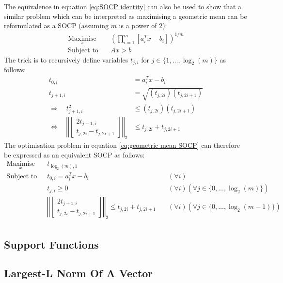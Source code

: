 The equivalence in equation \ref{eq:SOCP identity} can also be used to show that a similar problem which can be interpreted as maximising a geometric mean can be reformulated as a SOCP (assuming $m$ is a power of 2):
\begin{equation}
\begin{aligned}
    \underset{x}{\text{Maximise}} \quad & \left( \prod_{i=1}^{m}\left[ a_i^T x - b_i \right] \right)^{1/m} \\
    \text{Subject to} \quad & Ax > b
\end{aligned} \label{eq:geometric mean SOCP}
\end{equation}
The trick is to recursively define variables $t_{j, i}$ for $j\in\{1,\hdots,\log_2(m)\}$ as follows:
\begin{align*}
    t_{0, i} &= a_i^T x - b_i \\
    t_{j+1, i} &= \sqrt{(t_{j, 2i})(t_{j, 2i+1})} \\
    \Rightarrow \quad t_{j+1, i}^2 &\le (t_{j, 2i})(t_{j, 2i+1}) \\
    \Leftrightarrow \quad \left\Vert\begin{bmatrix}
        2t_{j+1, i} \\
        t_{j, 2i} - t_{j, 2i+1}
    \end{bmatrix}\right\Vert_2 &\le t_{j, 2i} + t_{j, 2i+1}
\end{align*}
The optimisation problem in equation \ref{eq:geometric mean SOCP} can therefore be expressed as an equivalent SOCP as follows:
\begin{equation}
\begin{aligned}
    \underset{x}{\text{Maximise}} \quad & t_{\log_2(m), 1} \\
    \text{Subject to} \quad & t_{0, i} = a_i^T x - b_i \quad & (\forall i) \\
    & t_{j, i} \ge 0 \quad & (\forall i)(\forall j \in \{0, \hdots, \log_2(m)\}) \\
    & \left\Vert\begin{bmatrix}
        2t_{j+1, i} \\
        t_{j, 2i} - t_{j, 2i+1}
    \end{bmatrix}\right\Vert_2 \le t_{j, 2i} + t_{j, 2i+1} \quad & (\forall i)(\forall j \in \{0, \hdots, \log_2(m-1)\}) \\
\end{aligned}
\end{equation}

\subsection{Support Functions}
\subsection{Largest-L Norm Of A Vector}
